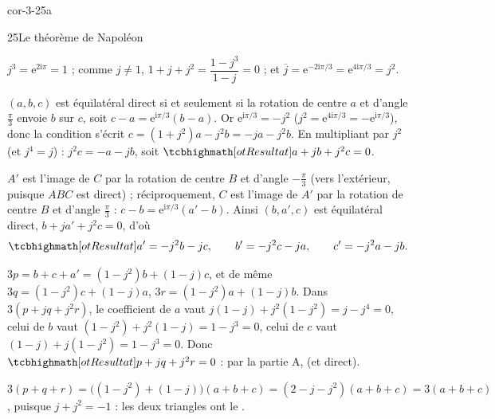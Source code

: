 
\begin{blocLivre}{cor-3-25a}
\begin{corrige}{25}{Le théorème de Napoléon}
\begin{questions}
  \item $j^{3}=\mathrm{e}^{2\mathrm{i}\pi}=1$ ; comme $j\neq1$,
    $1+j+j^{2}=\dfrac{1-j^{3}}{1-j}=0$ ; et
    $\overline{j}=\mathrm{e}^{-2\mathrm{i}\pi/3}=\mathrm{e}^{4\mathrm{i}\pi/3}=j^{2}$.
  \item $(a,b,c)$ est équilatéral direct si et seulement si la rotation
    de centre $a$ et d'angle $\frac{\pi}{3}$ envoie $b$ sur $c$, soit
    $c-a=\mathrm{e}^{\mathrm{i}\pi/3}(b-a)$. Or
    $\mathrm{e}^{\mathrm{i}\pi/3}=-j^{2}$ ($j^{2}=\mathrm{e}^{4\mathrm{i}\pi/3}
    =-\mathrm{e}^{\mathrm{i}\pi/3}$), donc la condition s'écrit
    $c=(1+j^{2})a-j^{2}b=-ja-j^{2}b$. En multipliant par $j^{2}$ (et
    $j^{4}=j$) : $j^{2}c=-a-jb$, soit $\res{a+jb+j^{2}c=0}$.
\end{questions}
\begin{questions}[resume]
  \item $A'$ est l'image de $C$ par la rotation de centre $B$ et d'angle
    $-\frac{\pi}{3}$ (vers l'extérieur, puisque $ABC$ est direct) ;
    réciproquement, $C$ est l'image de $A'$ par la rotation de centre $B$
    et d'angle $\frac{\pi}{3}$ : $c-b=\mathrm{e}^{\mathrm{i}\pi/3}(a'-b)$.
    Ainsi $(b,a',c)$ est équilatéral direct, $b+ja'+j^{2}c=0$, d'où
    \[
    \res{a'=-j^{2}b-jc},\qquad b'=-j^{2}c-ja,\qquad c'=-j^{2}a-jb .
    \]
  \item $3p=b+c+a'=(1-j^{2})b+(1-j)c$, et de même
    $3q=(1-j^{2})c+(1-j)a$, $3r=(1-j^{2})a+(1-j)b$. Dans
    $3(p+jq+j^{2}r)$, le coefficient de $a$ vaut
    $j(1-j)+j^{2}(1-j^{2})=j-j^{4}=0$, celui de $b$ vaut
    $(1-j^{2})+j^{2}(1-j)=1-j^{3}=0$, celui de $c$ vaut
    $(1-j)+j(1-j^{2})=1-j^{3}=0$. Donc $\res{p+jq+j^{2}r=0}$ : par la
    partie A,  (et direct).
  \item $3(p+q+r)=\bigl((1-j^{2})+(1-j)\bigr)(a+b+c)
    =(2-j-j^{2})(a+b+c)=3(a+b+c)$, puisque $j+j^{2}=-1$ : les deux
    triangles ont le .
\end{questions}
\end{corrige}
\end{blocLivre}

